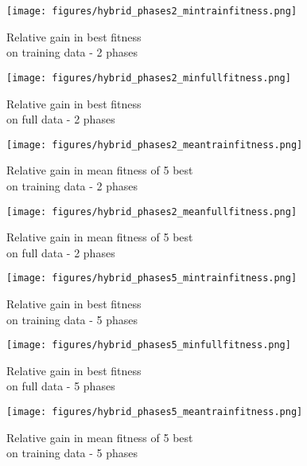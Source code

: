\begin{figure*}
\captionsetup[subfigure]{justification=centering}

    \centering
    \begin{subfigure}{0.5\textwidth}
    \centering
    \texttt{[image: figures/hybrid\_phases2\_mintrainfitness.png]}
    \caption{Relative gain in best fitness\\ on training data - 2 phases}
    \end{subfigure}%
    \begin{subfigure}{0.5\textwidth}
    \centering
     \texttt{[image: figures/hybrid\_phases2\_minfullfitness.png]}
    \caption{Relative gain in best fitness\\ on full data - 2 phases}
    \end{subfigure}
    \begin{subfigure}{0.5\textwidth}
    \centering
    \texttt{[image: figures/hybrid\_phases2\_meantrainfitness.png]}
    \caption{Relative gain in mean fitness of 5 best\\ on training data - 2 phases}
    \end{subfigure}%
    \begin{subfigure}{0.5\textwidth}
    \centering
    \texttt{[image: figures/hybrid\_phases2\_meanfullfitness.png]}
    \caption{Relative gain in mean fitness of 5 best\\ on full data - 2 phases}
    \label{fig:2phase}
    \end{subfigure}
    \begin{subfigure}{0.5\textwidth}
    \centering
        \texttt{[image: figures/hybrid\_phases5\_mintrainfitness.png]}
        \caption{Relative gain in best fitness\\ on training data - 5 phases}
    \end{subfigure}%
    \begin{subfigure}{0.5\textwidth}
    \centering
        \texttt{[image: figures/hybrid\_phases5\_minfullfitness.png]}
        \caption{Relative gain in best fitness\\ on full data - 5 phases}
    \end{subfigure}
        \begin{subfigure}{0.5\textwidth}
    \centering
        \texttt{[image: figures/hybrid\_phases5\_meantrainfitness.png]}
        \caption{Relative gain in mean fitness of 5 best\\ on training data - 5 phases}

\end{subfigure}
\end{figure*}
